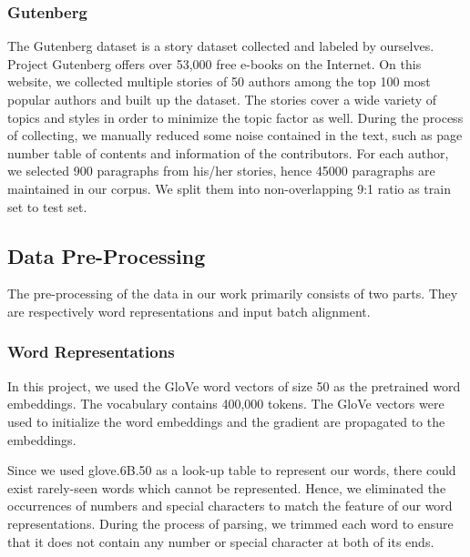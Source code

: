 \documentclass{article} %
\begin{document}
\subsubsection{Gutenberg}
The Gutenberg dataset is a story dataset collected and labeled by ourselves. Project Gutenberg \cite{Gutenberg}  offers over 53,000 free e-books on the Internet. On this website, we collected multiple stories of 50 authors among the top 100 most popular authors and built up the dataset. The stories cover a wide variety of topics and styles in order to minimize the topic factor as well. During the process of collecting, we manually reduced some noise contained in the text, such as page number table of contents and information of the contributors. For each author, we selected 900 paragraphs from his/her stories, hence 45000 paragraphs are maintained in our corpus. We split them into non-overlapping 9:1 ratio as train set to test set.

\subsection{Data Pre-Processing}
The pre-processing of the data in our work primarily consists of two parts. They are respectively word representations and input batch alignment.


%
\subsubsection{Word Representations}
In this project, we used the GloVe \cite{glove} word vectors of size 50 as the pretrained word embeddings. The vocabulary contains 400,000 tokens. The GloVe vectors were used to initialize the word embeddings and the gradient are propagated to the embeddings.

Since we used glove.6B.50 as a look-up table to represent our words, there could exist rarely-seen words which cannot be represented.
Hence, we eliminated the occurrences of numbers and special characters to match the feature of our word representations. During the process of parsing, we trimmed each word to ensure that it does not contain any number or special character at both of its ends.
\end{document}
